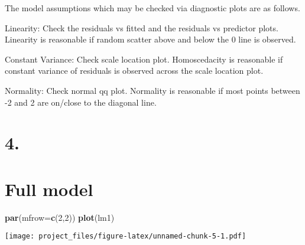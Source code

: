 \documentclass[]{article}
\newenvironment{Shaded}{\begin{snugshade}}{\end{snugshade}}
\newcommand{\KeywordTok}[1]{\textcolor[rgb]{0.13,0.29,0.53}{\textbf{#1}}}
\newcommand{\DataTypeTok}[1]{\textcolor[rgb]{0.13,0.29,0.53}{#1}}
\newcommand{\DecValTok}[1]{\textcolor[rgb]{0.00,0.00,0.81}{#1}}
\newcommand{\StringTok}[1]{\textcolor[rgb]{0.31,0.60,0.02}{#1}}
\newcommand{\OperatorTok}[1]{\textcolor[rgb]{0.81,0.36,0.00}{\textbf{#1}}}
\newcommand{\NormalTok}[1]{#1}
\begin{document}
The model assumptions which may be checked via diagnostic plots are as
follows.

Linearity: Check the residuals vs fitted and the residuals vs predictor
plots. Linearity is reasonable if random scatter above and below the 0
line is observed.

Constant Variance: Check scale location plot. Homoscedacity is
reasonable if constant variance of residuals is observed across the
scale location plot.

Normality: Check normal qq plot. Normality is reasonable if most points
between -2 and 2 are on/close to the diagonal line.

\section{4.}\label{section-3}

\section{Full model}\label{full-model}

\begin{Shaded}
\begin{Highlighting}[]
\KeywordTok{par}\NormalTok{(}\DataTypeTok{mfrow=}\KeywordTok{c}\NormalTok{(}\DecValTok{2}\NormalTok{,}\DecValTok{2}\NormalTok{))}
\KeywordTok{plot}\NormalTok{(lm1)}
\end{Highlighting}
\end{Shaded}

\texttt{[image: project\_files/figure-latex/unnamed-chunk-5-1.pdf]}

\begin{Shaded}
\end{Shaded}
\end{document}
